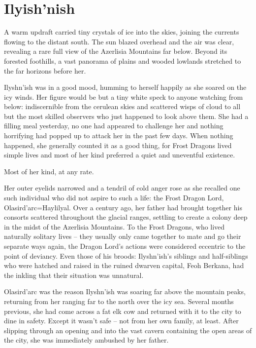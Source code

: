 

\chapter{Ilyish’nish}

A warm updraft carried tiny crystals of ice into the skies, joining the currents flowing to the distant south. The sun blazed overhead and the air was clear, revealing a rare full view of the Azerlisia Mountains far below. Beyond its forested foothills, a vast panorama of plains and wooded lowlands stretched to the far horizons before her.

 

Ilyshn’ish was in a good mood, humming to herself happily as she soared on the icy winds. Her figure would be but a tiny white speck to anyone watching from below: indiscernible from the cerulean skies and scattered wisps of cloud to all but the most skilled observers who just happened to look above them. She had a filling meal yesterday, no one had appeared to challenge her and nothing horrifying had popped up to attack her in the past few days. When nothing happened, she generally counted it as a good thing, for Frost Dragons lived simple lives and most of her kind preferred a quiet and uneventful existence.

 

Most of her kind, at any rate.

 

Her outer eyelids narrowed and a tendril of cold anger rose as she recalled one such individual who did not aspire to such a life: the Frost Dragon Lord, Olasird’arc=Haylilyal. Over a century ago, her father had brought together his consorts scattered throughout the glacial ranges, settling to create a colony deep in the midst of the Azerlisia Mountains. To the Frost Dragons, who lived naturally solitary lives – they usually only came together to mate and go their separate ways again, the Dragon Lord’s actions were considered eccentric to the point of deviancy. Even those of his broods: Ilyshn’ish’s siblings and half-siblings who were hatched and raised in the ruined dwarven capital, Feoh Berkana, had the inkling that their situation was unnatural.

 

Olasird’arc was the reason Ilyshn’ish was soaring far above the mountain peaks, returning from her ranging far to the north over the icy sea. Several months previous, she had come across a fat elk cow and returned with it to the city to dine in safety. Except it wasn’t safe – not from her own family, at least. After slipping through an opening and into the vast cavern containing the open areas of the city, she was immediately ambushed by her father.

